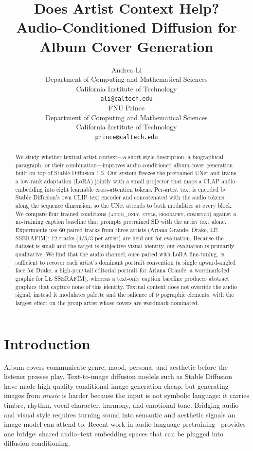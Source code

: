 \documentclass{article}
\title{Does Artist Context Help?\\
Audio-Conditioned Diffusion for Album Cover Generation}
\author{%
  Andrea Li \\
  Department of Computing and Mathematical Sciences \\
  California Institute of Technology \\
  \texttt{ali@caltech.edu} \\
  \And
  FNU Prince \\
  Department of Computing and Mathematical Sciences \\
  California Institute of Technology \\
  \texttt{prince@caltech.edu} \\
}
\begin{document}
\maketitle

\begin{abstract}
We study whether textual artist context---a short style description, a
biographical paragraph, or their combination---improves audio-conditioned
album-cover generation built on top of Stable Diffusion 1.5. Our system
freezes the pretrained UNet and trains a low-rank adaptation (LoRA) jointly
with a small projector that maps a CLAP audio embedding into eight learnable
cross-attention tokens. Per-artist text is encoded by Stable Diffusion's own
CLIP text encoder and concatenated with the audio tokens along the sequence
dimension, so the UNet attends to both modalities at every block. We compare
four trained conditions
(\textsc{audio\_only}, \textsc{style}, \textsc{biography}, \textsc{combined})
against a no-training caption baseline that prompts pretrained SD with the
artist text alone. Experiments use 60 paired tracks from three artists
(Ariana Grande, Drake, LE SSERAFIM); 12 tracks (4/5/3 per artist) are held
out for evaluation. Because the dataset is small and the target is subjective
visual identity, our evaluation is primarily qualitative. We find that the
audio channel, once paired with LoRA fine-tuning, is sufficient to recover
each artist's dominant portrait convention (a single upward-angled face for
Drake, a high-ponytail editorial portrait for Ariana Grande, a wordmark-led
graphic for LE SSERAFIM), whereas a text-only caption baseline produces
abstract graphics that capture none of this identity. Textual context does
not override the audio signal; instead it modulates palette and the salience
of typographic elements, with the largest effect on the group artist whose
covers are wordmark-dominated.
\end{abstract}

\section{Introduction}
\label{sec:intro}

Album covers communicate genre, mood, persona, and aesthetic before the
listener presses play. Text-to-image diffusion models such as Stable
Diffusion~\citep{rombach2022high} have made high-quality conditional
image generation cheap, but generating images from \emph{music} is harder
because the input is not symbolic language: it carries timbre, rhythm, vocal
character, harmony, and emotional tone. Bridging audio and visual style
requires turning sound into semantic and aesthetic signals an image model
can attend to. Recent work in audio-language pretraining~\citep{clap2023,
wu2023largescale, wav2clip2022} provides one bridge: shared audio--text
embedding spaces that can be plugged into diffusion conditioning.
\end{document}

